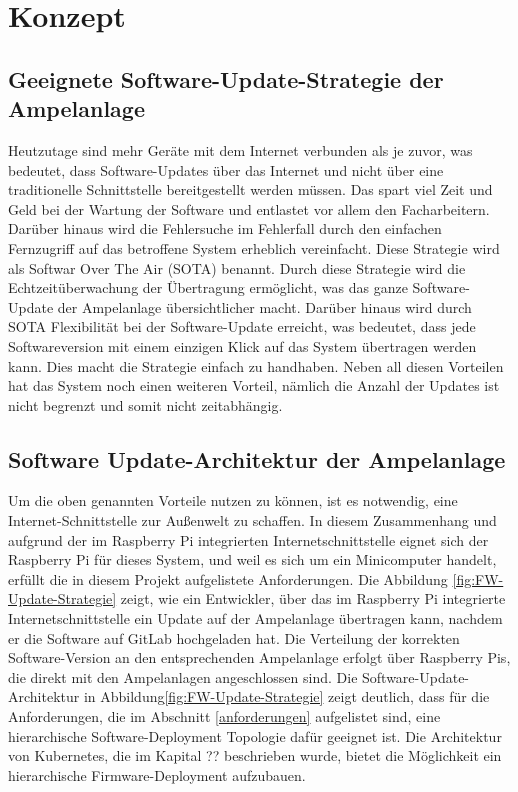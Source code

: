 \section{Konzept}


\subsection{Geeignete Software-Update-Strategie der Ampelanlage}

Heutzutage sind mehr Geräte mit dem Internet verbunden als je zuvor, was bedeutet, dass Software-Updates über das Internet und nicht über eine traditionelle Schnittstelle bereitgestellt werden müssen. Das spart viel Zeit und Geld bei der Wartung der Software und entlastet vor allem den Facharbeitern. Darüber hinaus wird die Fehlersuche im Fehlerfall durch den einfachen Fernzugriff auf das betroffene System erheblich vereinfacht. 
Diese Strategie wird als Softwar Over The Air (SOTA) benannt. Durch diese Strategie wird die Echtzeitüberwachung der Übertragung ermöglicht, was das ganze Software-Update der Ampelanlage übersichtlicher macht. Darüber hinaus wird durch SOTA Flexibilität bei der Software-Update erreicht, was bedeutet, dass jede Softwareversion mit einem einzigen Klick auf das System übertragen werden kann.
Dies macht die Strategie einfach zu handhaben. Neben all diesen Vorteilen hat das System noch einen weiteren Vorteil, nämlich die Anzahl der Updates ist nicht begrenzt und somit nicht zeitabhängig.


\subsection{Software Update-Architektur der Ampelanlage}

Um die oben genannten Vorteile nutzen zu können, ist es notwendig, eine Internet-Schnittstelle zur Außenwelt zu schaffen. In diesem Zusammenhang und aufgrund der im Raspberry Pi integrierten Internetschnittstelle eignet sich der Raspberry Pi für dieses System,  und weil es sich um ein Minicomputer handelt, erfüllt die in diesem Projekt aufgelistete Anforderungen. Die Abbildung \ref{fig:FW-Update-Strategie} zeigt, wie ein Entwickler, über das im Raspberry Pi integrierte Internetschnittstelle ein Update auf der Ampelanlage übertragen kann, nachdem er die Software auf GitLab hochgeladen hat. Die Verteilung der korrekten Software-Version an den entsprechenden Ampelanlage erfolgt über Raspberry Pis, die direkt mit den Ampelanlagen angeschlossen sind.
\newline\newline
Die Software-Update-Architektur in Abbildung\ref{fig:FW-Update-Strategie} zeigt deutlich, dass für die Anforderungen, die im Abschnitt \ref{anforderungen} aufgelistet sind, eine hierarchische Software-Deployment Topologie dafür geeignet ist. 
\newline\newline
Die Architektur von Kubernetes, die im Kapital {\LARGE ??} beschrieben wurde, bietet die Möglichkeit ein hierarchische Firmware-Deployment aufzubauen.


